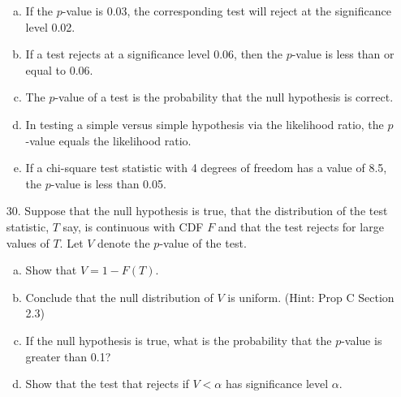 \documentclass{article}
\begin{document}
\begin{itemize}
\begin{enumerate}[a.]
			\item If the $p$-value is 0.03, the corresponding test will reject at the significance level 0.02.

			\item If a test rejects at a significance level 0.06, then the $p$-value is less than or equal to 0.06.

			\item The $p$-value of a test is the probability that the null hypothesis is correct.

			\item In testing a simple versus simple hypothesis via the likelihood ratio, the $p$-value equals the likelihood ratio.

			\item If a chi-square test statistic with 4 degrees of freedom has a value of 8.5, the $p$-value is less than 0.05.
				
		\end{enumerate}

	\item[30.] Suppose that the null hypothesis is true, that the distribution of the test statistic, $T$ say, is continuous with CDF $F$ and that the test rejects for large values of $T.$ Let $V$ denote the $p$-value of the test.
		\begin{enumerate}[a.]
			\item Show that $V=1-F(T).$

			\item Conclude that the null distribution of $V$ is uniform. (Hint: Prop C Section 2.3)

			\item If the null hypothesis is true, what is the probability that the $p$-value is greater than 0.1?

			\item Show that the test that rejects if $V<\alpha$ has significance level $\alpha.$
				
		\end{enumerate}
		
\end{itemize}
\end{document}
